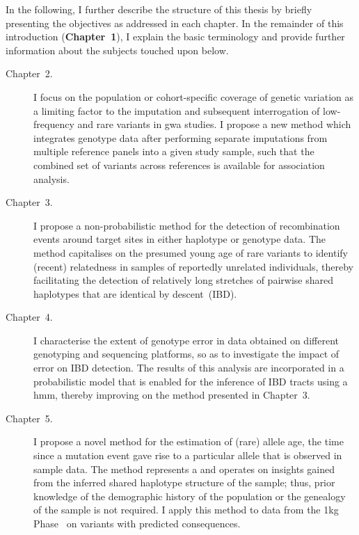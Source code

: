 In the following, I further describe the structure of this thesis by briefly presenting the objectives as addressed in each chapter.
In the remainder of this introduction (\textbf{Chapter~1}), I explain the basic terminology and provide further information about the subjects touched upon below.

\begin{description}
  \item[Chapter~2.] I focus on the population or cohort-specific coverage of genetic variation as a limiting factor to the imputation and subsequent interrogation of low-frequency and rare variants in \gls{gwa} studies.
	I propose a new method which integrates genotype data after performing separate imputations from multiple reference panels into a given study sample, such that the combined set of variants across references is available for association analysis.

  \item[Chapter~3.] I propose a non-probabilistic method for the detection of recombination events around target sites in either haplotype or genotype data.
  The method capitalises on the presumed young age of rare variants to identify (recent) relatedness in samples of reportedly unrelated individuals, thereby facilitating the detection of relatively long stretches of pairwise shared haplotypes that are identical by descent~(IBD).

  \item[Chapter~4.] I characterise the extent of genotype error in data obtained on different genotyping and sequencing platforms, so as to investigate the impact of error on IBD detection.
  The results of this analysis are incorporated in a probabilistic model that is enabled for the inference of IBD tracts using a \gls{hmm}, thereby improving on the method presented in Chapter~3.

  \item[Chapter~5.] I propose a novel method for the estimation of (rare) allele age, \ie the time since a mutation event gave rise to a particular allele that is observed in sample data.
  The method represents a  and operates on insights gained from the inferred shared haplotype structure of the sample; thus, prior knowledge of the demographic history of the population or the genealogy of the sample is not required.
	I apply this method to data from the \gls{1kg} Phase~ on variants with predicted consequences.
\end{description}


